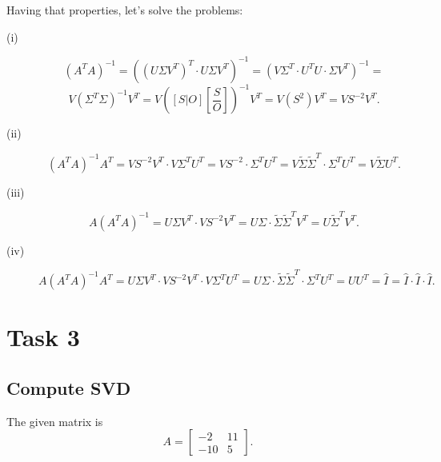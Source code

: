 \documentclass[14pt, notitlepage]{article}
\begin{document}
Having that properties, let's solve the problems:
\begin{description}
    \item [(i)] \[
        \left( A^T A \right)^{-1} = \left( \left(U \Sigma V^T\right)^T \cdot U \Sigma V^T \right)^{-1} = 
        \left( V \Sigma^T \cdot U^T U \cdot \Sigma V^T \right)^{-1} = \]\[
        V \left( \Sigma^T \Sigma \right)^{-1} V^T =
        V \left( \left[S | O\right] \left[\frac{S}{O}\right] \right)^{-1} V^T = 
        V \left(S^2\right) V^T = V S^{-2} V^T.
    \]

    \item [(ii)] \[
        \left( A^T A \right)^{-1} A^T = V S^{-2} V^T \cdot V \Sigma^T U^T =
        V S^{-2} \cdot \Sigma^T U^T = V \tilde{\Sigma} \tilde{\Sigma}^T \cdot \Sigma^T U^T =
        V \tilde{\Sigma} U^T.
    \]

    \item [(iii)] \[
        A \left( A^T A \right)^{-1} = U \Sigma V^T \cdot V S^{-2} V^T =
        U \Sigma \cdot \tilde{\Sigma} \tilde{\Sigma}^T V^T =
        U \tilde{\Sigma}^T V^T.
    \]

    \item [(iv)] \[
        A \left( A^T A \right)^{-1} A^T = U \Sigma V^T \cdot V S^{-2} V^T \cdot V \Sigma^T U^T =
        U \Sigma \cdot \tilde{\Sigma} \tilde{\Sigma}^T \cdot \Sigma^T U^T =
        U U^T = \hat{I} = \hat{I} \cdot \hat{I} \cdot \hat{I}.
    \]
\end{description}

\section*{Task 3}
\subsection*{Compute SVD}

The given matrix is
\[
    A = \begin{bmatrix}
        -2  & 11 \\
        -10 & 5
    \end{bmatrix}.
\]
\end{document}
